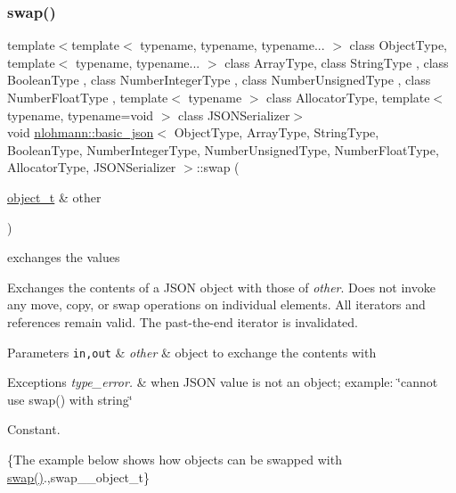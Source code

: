 \subsubsection{\texorpdfstring{swap()}{swap()}\hspace{0.1cm}{\footnotesize\ttfamily [3/4]}}
{\footnotesize\ttfamily template$<$template$<$ typename, typename, typename... $>$ class Object\+Type, template$<$ typename, typename... $>$ class Array\+Type, class String\+Type , class Boolean\+Type , class Number\+Integer\+Type , class Number\+Unsigned\+Type , class Number\+Float\+Type , template$<$ typename $>$ class Allocator\+Type, template$<$ typename, typename=void $>$ class J\+S\+O\+N\+Serializer$>$ \\
void \hyperlink{classnlohmann_1_1basic__json}{nlohmann\+::basic\+\_\+json}$<$ Object\+Type, Array\+Type, String\+Type, Boolean\+Type, Number\+Integer\+Type, Number\+Unsigned\+Type, Number\+Float\+Type, Allocator\+Type, J\+S\+O\+N\+Serializer $>$\+::swap (\begin{DoxyParamCaption}\item[{\hyperlink{classnlohmann_1_1basic__json_a5e48a7893520e1314bf0c9723e26ea2a}{object\+\_\+t} \&}]{other }\end{DoxyParamCaption})\hspace{0.3cm}{\ttfamily [inline]}}



exchanges the values 

Exchanges the contents of a J\+S\+ON object with those of {\itshape other}. Does not invoke any move, copy, or swap operations on individual elements. All iterators and references remain valid. The past-\/the-\/end iterator is invalidated.


\begin{DoxyParams}[1]{Parameters}
\mbox{\tt in,out}  & {\em other} & object to exchange the contents with\\
\hline
\end{DoxyParams}

\begin{DoxyExceptions}{Exceptions}
{\em type\+\_\+error.} & when J\+S\+ON value is not an object; example\+: {\ttfamily \char`\"{}cannot use swap() with string\char`\"{}}\\
\hline
\end{DoxyExceptions}
Constant.

\{The example below shows how objects can be swapped with {\ttfamily \hyperlink{classnlohmann_1_1basic__json_a8c9d932353e1ab98a7dc2fc27e002031}{swap()}}.,swap\+\_\+\+\_\+object\+\_\+t\}

